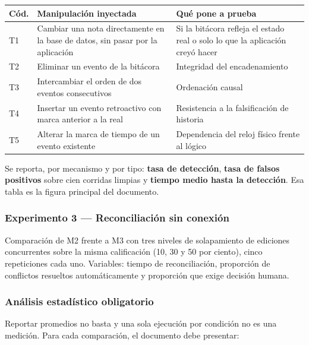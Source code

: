 \documentclass[11pt,a4paper]{article}
\begin{document}
	\begin{center}
		\small
		\begin{tabular}{@{}p{1.0cm}p{6.0cm}p{7.6cm}@{}}
			\toprule
			\textbf{Cód.} & \textbf{Manipulación inyectada} & \textbf{Qué pone a prueba} \\
			\midrule
			T1 & Cambiar una nota directamente en la base de datos, sin pasar por la aplicación & Si la bitácora refleja el estado real o solo lo que la aplicación creyó hacer \\
			T2 & Eliminar un evento de la bitácora & Integridad del encadenamiento \\
			T3 & Intercambiar el orden de dos eventos consecutivos & Ordenación causal \\
			T4 & Insertar un evento retroactivo con marca anterior a la real & Resistencia a la falsificación de historia \\
			T5 & Alterar la marca de tiempo de un evento existente & Dependencia del reloj físico frente al lógico \\
			\bottomrule
		\end{tabular}
	\end{center}
	
	Se reporta, por mecanismo y por tipo: \textbf{tasa de detección}, \textbf{tasa de falsos positivos} sobre cien corridas limpias y \textbf{tiempo medio hasta la detección}. Esa tabla es la figura principal del documento.
	
	\subsubsection{Experimento 3 --- Reconciliación sin conexión}
	
	Comparación de M2 frente a M3 con tres niveles de solapamiento de ediciones concurrentes sobre la misma calificación (10, 30 y 50 por ciento), cinco repeticiones cada uno. Variables: tiempo de reconciliación, proporción de conflictos resueltos automáticamente y proporción que exige decisión humana.
	
	\subsubsection{Análisis estadístico obligatorio}
	
	Reportar promedios no basta y una sola ejecución por condición no es una medición. Para cada comparación, el documento debe presentar:
	
\end{document}
